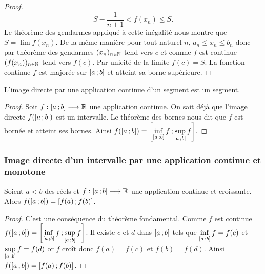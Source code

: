 \begin{proof}
  \begin{equation}
    S-\frac{1}{n+1} < f(x_n) \leqslant S.
  \end{equation}
  Le théorème des gendarmes appliqué à cette inégalité nous montre que \(S=\lim f(x_n)\). De la même manière pour tout naturel \(n\), \(a_n \leqslant x_n \leqslant b_n\) donc par théorème des gendarmes \((x_n)_{n\in \mathbb{N}}\) tend vers \(c\) et comme \(f\) est continue \((f(x_n))_{n\in \mathbb{N}}\) tend vers \(f(c)\). Par unicité de la limite \(f(c)=S\). La fonction continue \(f\) est majorée sur \(\left[ a \, ;  b \right]\) et atteint sa borne supérieure.
\end{proof}

\begin{theo}
  L'image directe par une application continue d'un segment est un segment.
\end{theo}
\begin{proof}
  Soit \(f:\left[ a \, ;  b \right] \longrightarrow \mathbb{R}\) une application continue. On sait déjà que l'image directe \(f(\left[ a \, ;  b \right])\) est un intervalle. Le théorème des bornes nous dit que \(f\) est bornée et atteint ses bornes. Ainsi \(f(\left[ a \, ;  b \right])=\left[ \inf\limits_{\left[ a \, ;  b \right]}f \, ;  \sup\limits_{\left[ a \, ;  b \right]}f \right]\).
\end{proof}

\subsubsection[Image directe d'un intervalle]{Image directe d'un intervalle par une application continue et monotone}

\begin{theo} \label{theo:imagesegment}
  Soient \(a<b\) des réels et \(f:\left[ a \, ;  b \right] \longrightarrow \mathbb{R}\) une application continue et croissante. Alors \(f(\left[ a \, ;  b \right])=\left[ f(a) \, ;  f(b) \right]\).
\end{theo}
\begin{proof}
  C'est une conséquence du théorème fondamental. Comme \(f\) est continue \(f(\left[ a \, ;  b \right])=\left[ \inf\limits_{\left[ a \, ;  b \right]}f \, ;  \sup\limits_{\left[ a \, ;  b \right]}f \right]\). Il existe \(c\) et \(d\) dans \(\left[ a \, ;  b \right]\) tels que \(\inf\limits_{\left[ a \, ;  b \right]}f=f(c)\) et \(\sup\limits_{\left[ a \, ;  b \right]}f=f(d)\) or \(f\) croît donc \(f(a)=f(c)\) et \(f(b)=f(d)\). Ainsi \(f(\left[ a \, ;  b \right])=\left[ f(a) \, ;  f(b) \right]\).
\end{proof}

